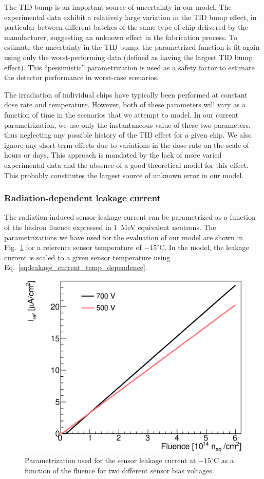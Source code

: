 The TID bump is an important source of uncertainty in our model. The experimental data exhibit
a relatively large variation in the TID bump effect, in particular
between different batches of the same type of chip delivered by the manufacturer, suggesting an unknown
effect in the fabrication process. To estimate the uncertainty in the TID bump,
the parametrized function is fit again using only the worst-performing data (defined as having the
largest TID bump effect). This ``pessimistic'' parametrization is used as a safety factor to estimate
the detector performance in worst-case scenarios.

The irradiation of individual chips have typically been performed at constant dose rate and temperature.
However, both of these parameters will vary as a function of time in the scenarios that we attempt to model.
In our current parametrization, we use only the instantaneous value of these two parameters, thus neglecting any possible history of the TID effect for a given chip. We also ignore any short-term effects due to variations in the dose rate on the scale of hours or days. This approach is mandated by the lack of more varied experimental data and the absence of a good theoretical model for this effect. This probably constitutes the largest source of unknown error in our model.

\subsubsection{Radiation-dependent leakage current}

The radiation-induced sensor leakage current can be parametrized as a function of the hadron fluence expressed in 1~MeV equivalent neutrons. The parametrizations we have used for the evaluation of our model are shown in Fig.~\ref{fig:leakage} for a reference sensor temperature of $-15^\circ$C. In the model, the leakage current is scaled to a given sensor temperature using Eq.~\ref{eq:leakage_current_temp_dependence}.

\begin{figure}[ht]
\centering
\includegraphics[width=0.45\linewidth]{figures/SensorLeakagePower.eps}
\caption{Parametrization used for the sensor leakage current at $-15^\circ$C as a function of the fluence for two different sensor bias voltages.}
\label{fig:leakage}
\end{figure}
